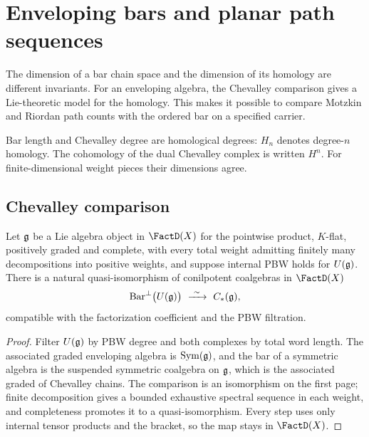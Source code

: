 \chapter{Enveloping bars and planar path sequences}
\label{ch:enveloping-audit}

The dimension of a bar chain space and the dimension of its homology are different invariants. For an enveloping algebra, the Chevalley comparison gives a Lie-theoretic model for the homology. This makes it possible to compare Motzkin and Riordan path counts with the ordered bar on a specified carrier.

Bar length and Chevalley degree are homological degrees: $H_n$ denotes degree-$n$ homology. The cohomology of the dual Chevalley complex is written $H^n$. For finite-dimensional weight pieces their dimensions agree.

\section{Chevalley comparison}

\begin{theorem}
\label{thm:bar-chevalley-spine}
Let $\mathfrak g$ be a Lie algebra object in $\FactD(X)$ for the pointwise product,
$K$-flat, positively graded and complete, with every total weight admitting
finitely many decompositions into positive weights, and suppose internal PBW
holds for $U(\mathfrak g)$. There is a natural quasi-isomorphism of conilpotent
coalgebras in $\FactD(X)$
\[
 \BarPerp\bigl(U(\g)\bigr)\ \xrightarrow{\ \sim\ }\ C_*(\g),
\]
compatible with the factorization coefficient and the PBW filtration.
\end{theorem}
\begin{proof}
Filter $U(\mathfrak g)$ by PBW degree and both complexes by total word length. The
associated graded enveloping algebra is $\operatorname{Sym}(\mathfrak g)$, and the bar of a symmetric
algebra is the suspended symmetric coalgebra on $\mathfrak g$, which is the associated
graded of Chevalley chains. The comparison is an isomorphism on the first page;
finite decomposition gives a bounded exhaustive spectral sequence in each
weight, and completeness promotes it to a quasi-isomorphism. Every step uses
only internal tensor products and the bracket, so the map stays in $\FactD(X)$.
\end{proof}

